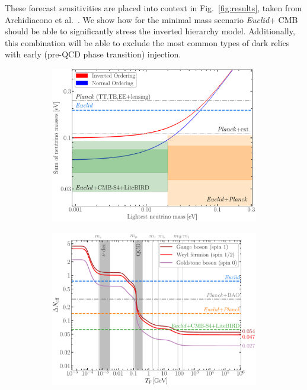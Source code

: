 \documentclass[a4paper,11pt]{article}
\newcommand{\euclid}{\textit{Euclid}\xspace}
\begin{document}
These forecast sensitivities are placed into  context in Fig.~\ref{fig:results}, taken from Archidiacono et al.~\cite{EP-Archidiacono}. We show how for the minimal mass scenario \euclid + CMB should be able to significantly stress the inverted hierarchy model. Additionally, this combination will be able to exclude the most common types of dark relics with early (pre-QCD phase transition) injection.   

\begin{figure}[!htbp]
    \centering
    \begin{subfigure}{0.49\textwidth}
        \centering
        \includegraphics[width=\linewidth]{figure_hierarchy-1.pdf}
    \end{subfigure}
    \hfill
    \begin{subfigure}{0.49\textwidth}
        \centering
        \includegraphics[width=\linewidth]{figure_Neff-1.pdf}

\end{subfigure}
\end{figure}
\end{document}
